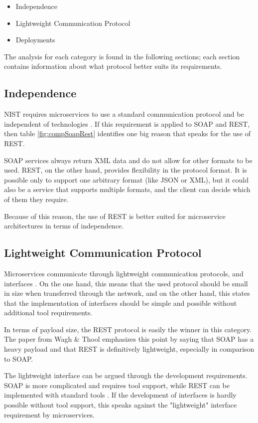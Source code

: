 \documentclass[conference]{IEEEtran}
\begin{document}
\begin{itemize}
	\item Independence
	\item Lightweight Communication Protocol
	\item Deployments
\end{itemize} 

The analysis for each category is found in the following sections; each section contains information about what protocol better suits its requirements.

\subsection{Independence}

NIST requires microservices to use a standard communication protocol and be independent of technologies \cite{karmel2016nist}. If this requirement is applied to SOAP and REST, then table \ref{fig:compSoapRest} identifies one big reason that speaks for the use of REST.

SOAP services always return XML data and do not allow for other formats to be used. REST, on the other hand, provides flexibility in the protocol format. It is possible only to support one arbitrary format (like JSON or XML), but it could also be a service that supports multiple formats, and the client can decide which of them they require.

Because of this reason, the use of REST is better suited for microservice architectures in terms of independence.

\subsection{Lightweight Communication Protocol}

Microservices communicate through lightweight communication protocols, and interfaces \cite{karmel2016nist}. On the one hand, this means that the used protocol should be small in size when transferred through the network, and on the other hand, this states that the implementation of interfaces should be simple and possible without additional tool requirements.

In terms of payload size, the REST protocol is easily the winner in this category. The paper from Wagh \& Thool \cite{wagh2012comparative} emphasizes this point by saying that SOAP has a heavy payload and that REST is definitively lightweight, especially in comparison to SOAP.

The lightweight interface can be argued through the development requirements. SOAP is more complicated and requires tool support, while REST can be implemented with standard tools \cite{wagh2012comparative}. If the development of interfaces is hardly possible without tool support, this speaks against the "lightweight" interface requirement by microservices.
\end{document}
